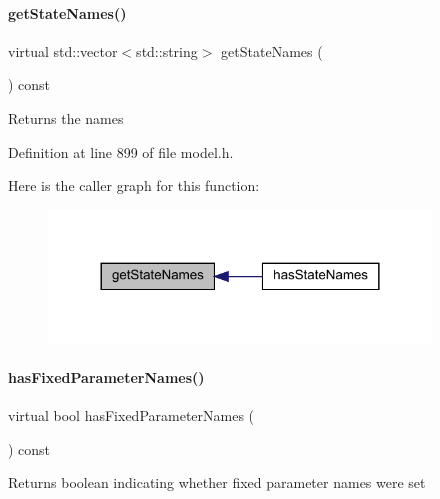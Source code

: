 \paragraph{\texorpdfstring{get\+State\+Names()}{getStateNames()}}
{\footnotesize\ttfamily virtual std\+::vector$<$std\+::string$>$ get\+State\+Names (\begin{DoxyParamCaption}{ }\end{DoxyParamCaption}) const\hspace{0.3cm}{\ttfamily [virtual]}}

\begin{DoxyReturn}{Returns}
the names 
\end{DoxyReturn}


Definition at line 899 of file model.\+h.

Here is the caller graph for this function\+:
\nopagebreak
\begin{figure}[H]
\begin{center}
\leavevmode
\includegraphics[width=288pt]{classamici_1_1_model_a1c55f5cf94db51bb2bbb26d4c425eb0a_icgraph}
\end{center}
\end{figure}
\mbox{\label{classamici_1_1_model_a964e924a1fe271f88bac4cfa909e2879}} 
\paragraph{\texorpdfstring{has\+Fixed\+Parameter\+Names()}{hasFixedParameterNames()}}
{\footnotesize\ttfamily virtual bool has\+Fixed\+Parameter\+Names (\begin{DoxyParamCaption}{ }\end{DoxyParamCaption}) const\hspace{0.3cm}{\ttfamily [virtual]}}

\begin{DoxyReturn}{Returns}
boolean indicating whether fixed parameter names were set 
\end{DoxyReturn}


